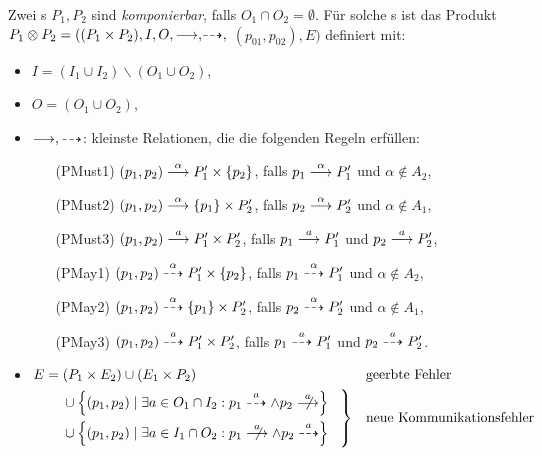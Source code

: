 \begin{Def}[Parallelprodukt]
  Zwei \MEIO{}s $P_1,P_2$ sind \emph{komponierbar}, falls $O_1\cap
  O_2=\emptyset$. Für solche \MEIO{}s ist das Produkt $P_1\otimes
  P_2=((P_1\times P_2), I, O, {\must,} {\may,}$ $(p_{01}, p_{02}),
  E)$ definiert mit: 
  \begin{itemize}
    \item $I=(I_1\cup I_2)\backslash (O_1\cup O_2)$,
    \item $O=(O_1\cup O_2)$,
    \item $\must, \may$: kleinste Relationen, die die
      folgenden Regeln erfüllen:
    \begin{itemize}
      \item[(PMust1)] $(p_1,p_2)\must[\alpha] P_1'\times \{p_2\}$, falls
        $p_1\must[\alpha] P_1'$ und $\alpha\notin A_2$,
      \item[(PMust2)] $(p_1,p_2)\must[\alpha] \{p_1\}\times P_2'$, falls
        $p_2\must[\alpha] P_2'$ und $\alpha\notin A_1$,
      \item[(PMust3)] $(p_1,p_2)\must[a] P_1'\times P_2'$, falls
        $p_1\must[a] P_1'$ und $p_2\must[a] P_2'$,
      \item[(PMay1)] $(p_1,p_2)\may[\alpha] P_1'\times \{p_2\}$, falls
        $p_1\may[\alpha] P_1'$ und $\alpha\notin A_2$,
      \item[(PMay2)] $(p_1,p_2)\may[\alpha] \{p_1\}\times P_2'$, falls
        $p_2\may[\alpha] P_2'$ und $\alpha\notin A_1$,
      \item[(PMay3)] $(p_1,p_2)\may[a] P_1'\times P_2'$, falls
        $p_1\may[a] P_1'$ und $p_2\may[a] P_2'$.
    \end{itemize}
  \item $\begin{aligned}[t]
      E & = (P_1\times E_2) \cup (E_1\times P_2) &&\text{geerbte Fehler}\\
        &\quad\left. \begin{aligned}
        &\cup \left\{(p_1,p_2) \mid \exists a \in O_1\cap I_2 : p_1
        \may[a]\land p_2\nmust[a]\right\}\\
        &\cup \left\{(p_1,p_2) \mid \exists a\in I_1\cap O_2 :
        p_1\nmust[a]\land p_2\may[a]\right\}
        \end{aligned}\hspace{0.3cm}\right\} &&\text{neue Kommunikationsfehler}
    \end{aligned}$
  \end{itemize}
\end{Def}

